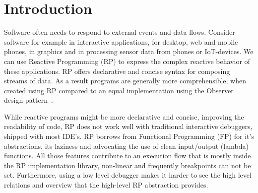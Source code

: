 \section{Introduction}

Software often needs to respond to external events and data flows. Consider software for example in interactive applications, for desktop, web and mobile phones, in graphics and in processing sensor data from phones or IoT-devices. We can use Reactive Programming (RP) to express the complex reactive behavior of these applications. RP offers declarative and concise syntax for composing streams of data. As a result programs are generally more comprehensible, when created using RP compared to an equal implementation using the Observer design pattern~\cite{johnson1995design, salvaneschi2014empirical}.



While reactive programs might be more declarative and concise, improving the readability of code, RP does not work well with traditional interactive debuggers, shipped with most IDE's. RP borrows from Functional Programming (FP) for it's abstractions, its laziness and advocating the use of clean input/output (lambda) functions. All those features contribute to an execution flow that is mostly inside the RP implementation library, non-linear and frequently breakpoints can not be set. Furthermore, using a low level debugger makes it harder to see the high level relations and overview that the high-level RP abstraction provides.


